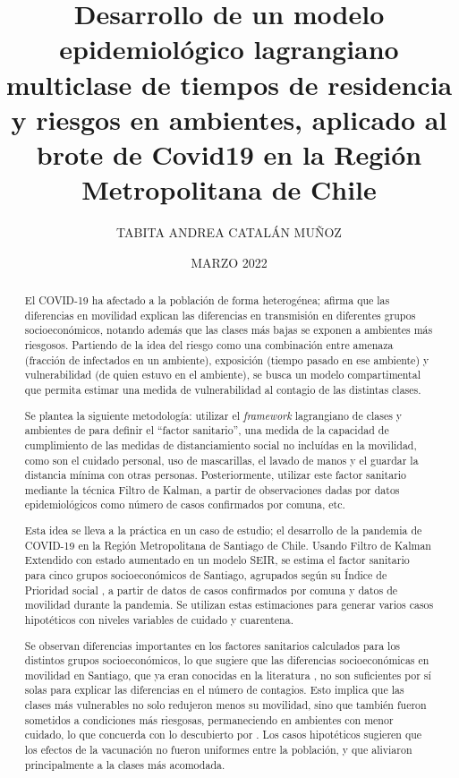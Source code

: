 \documentclass[upright, contnum]{umemoria}
\author{TABITA ANDREA CATALÁN MUÑOZ}
\title{Desarrollo de un modelo epidemiológico lagrangiano multiclase de tiempos de residencia y riesgos en ambientes, aplicado al brote de Covid19 en la Región Metropolitana de Chile}
\date{MARZO 2022}
\begin{document}
\frontmatter
\maketitle

\begin{abstract}

El COVID-19 ha afectado a la población de forma heterogénea; \cite{Chang2021} afirma que las diferencias en movilidad explican las diferencias en transmisión en diferentes grupos socioeconómicos, notando además que las clases más bajas se exponen a ambientes más riesgosos. Partiendo de la idea del riesgo como una combinación entre amenaza (fracción de infectados en un ambiente), exposición (tiempo pasado en ese ambiente) y vulnerabilidad (de quien estuvo en el ambiente), se busca un modelo compartimental que permita estimar una medida de vulnerabilidad al contagio de las distintas clases.

Se plantea la siguiente metodología: utilizar el \textit{framework} lagrangiano de clases y ambientes de \cite{Bichara2018} para definir el ``factor sanitario'', una medida de la capacidad de cumplimiento de las medidas de distanciamiento social no incluídas en la movilidad, como son el cuidado personal, uso de mascarillas, el lavado de manos y el guardar la distancia mínima con otras personas. Posteriormente, utilizar este factor sanitario mediante la técnica Filtro de Kalman, a partir de observaciones dadas por datos epidemiológicos como número de casos confirmados por comuna, etc.

Esta idea se lleva a la práctica en un caso de estudio; el desarrollo de la pandemia de COVID-19 en la Región Metropolitana de Santiago de Chile. Usando Filtro de Kalman Extendido con estado aumentado en un modelo SEIR, se estima el factor sanitario para cinco grupos socioeconómicos de Santiago, agrupados según su Índice de Prioridad social \cite{SEREMIRM2019}, a partir de datos de casos confirmados por comuna y datos de movilidad durante la pandemia. Se utilizan estas estimaciones para generar varios casos hipotéticos con niveles variables de cuidado y cuarentena.

Se observan diferencias importantes en los factores sanitarios calculados para los distintos grupos socioeconómicos, lo que sugiere que las diferencias socioeconómicas en movilidad en Santiago, que ya eran conocidas en la literatura \cite{Gozzi2021}, no son suficientes por sí solas para explicar las diferencias en el número de contagios. Esto implica que las clases más vulnerables no solo redujeron menos su movilidad, sino que también fueron sometidos a condiciones más riesgosas, permaneciendo en ambientes con menor cuidado, lo que concuerda con lo descubierto por \cite{Chang2021}. Los casos hipotéticos sugieren que los efectos de la vacunación no fueron uniformes entre la población, y que aliviaron principalmente a la clases más acomodada.


\end{abstract}
\end{document}
